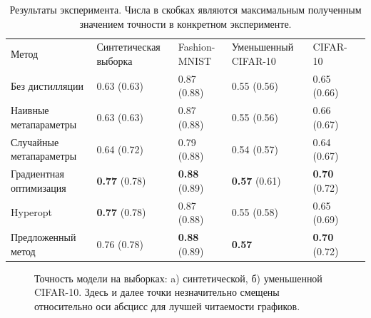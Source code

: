 \documentclass[12pt]{a&t}
\begin{document}
\begin{table}[]

\caption{Результаты эксперимента. Числа в скобках являются максимальным полученным значением точности в конкретном эксперименте.}

\label{table:results}
\footnotesize
\centering
\begin{tabularx}{\textwidth}{|X|X|X|X|X|X}
\cline{1-5}
Метод                      & Синтетическая выборка & Fashion-MNIST & Уменьшенный CIFAR-10 & CIFAR-10      &  \\\cline{1-5}
Без дистилляции        & 0.63 (0.63)             & 0.87  (0.88)        & 0.55     (0.56)        & 0.65 (0.66)         &  \\ \cline{1-5}
Наивные метапараметры        & 0.63  (0.63)              & 0.87 (0.88)         & 0.55  (0.56)             & 0.66  (0.67)        &  \\ \cline{1-5}
Случайные метапараметры       & 0.64   (0.72)           & 0.79   (0.88)       & 0.54 (0.57)             & 0.64 (0.67)        &  \\ \cline{1-5}
Градиентная оптимизация & \textbf{0.77} (0.78)    & \textbf{0.88} (0.89) & \textbf{0.57} (0.61)    & \textbf{0.70} (0.72) &  \\ \cline{1-5}
Hyperopt                    & \textbf{0.77} (0.78)                & 0.87 (0.88)         & 0.55  (0.58)           & 0.65 (0.69)          &  \\ \cline{1-5}
Предложенный метод                    & 0.76   (0.78)           & \textbf{0.88} (0.89) & \textbf{0.57}    & \textbf{0.70} (0.72) &  \\ \cline{1-5}
\end{tabularx}
\end{table}


\begin{figure}[ht]
    \begin{subfigure}[h]{0.5\linewidth}
    \label{fig:epoch_size}
    \end{subfigure}
    \begin{subfigure}[h]{0.5\linewidth}
    \label{fig:train_splines_every_epoch}
    \end{subfigure}
    \caption{%
    Точность модели на выборках: a) синтетической, б) уменьшенной CIFAR-10. Здесь и далее точки незначительно смещены относительно оси абсцисс для лучшей читаемости графиков.}
    \label{fig:accuracy}
\end{figure}
 
\end{document}
